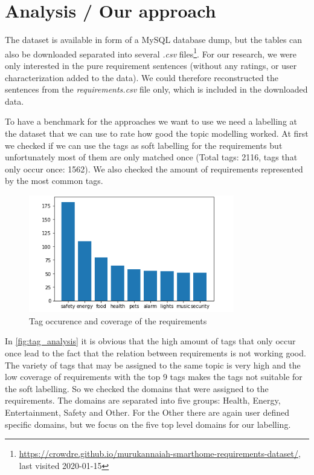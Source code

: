 \section{Analysis / Our approach} %
\label{sec:own_approach}

The \crowdre{} dataset is available in form of a MySQL database dump, but the tables can also be downloaded separated into several \textit{.csv} files\footnote{\url{https://crowdre.github.io/murukannaiah-smarthome-requirements-dataset/}, last visited 2020-01-15}. For our research, we were only interested in the pure requirement sentences (without any ratings, or user characterization added to the data). We could therefore reconstructed the sentences from the \textit{requirements.csv} file only, which is included in the downloaded data.

To have a benchmark for the approaches we want to use we need a labelling at the dataset that we can use to rate how good the topic modelling worked. At first we checked if we can use the tags as soft labelling for the requirements but unfortunately most of them are only matched once (Total tags: 2116, tags that only occur once: 1562). We also checked the amount of requirements represented by the most common tags. 

\begin{figure}[h]
  \centering
    \includegraphics[width=0.8\textwidth]{screenshots/tag_analysis.png}
    \caption{Tag occurence and coverage of the requirements}
    \label{fig:tag_analysis}
\end{figure}

In \autoref{fig:tag_analysis} it is obvious that the high amount of tags that only occur once lead to the fact that the relation between requirements is not working good. The variety of tags that may be assigned to the same topic is very high and the low coverage of requirements with the top 9 tags makes the tags not suitable for the soft labelling. So we checked the domains that were assigned to the requirements. The domains are separated into five groups: Health, Energy, Entertainment, Safety and Other. For the \grqq{}Other\grqq{} there are again user defined specific domains, but we focus on the five top level domains for our labelling.

